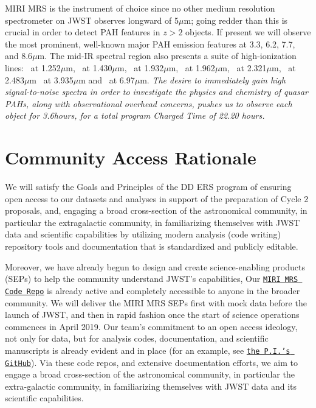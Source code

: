 \smallskip \smallskip
\noindent
MIRI MRS is the instrument of choice since no other medium resolution
spectrometer on JWST observes longward of 5$\mu$m; going redder than
this is crucial in order to detect PAH features in $z>2$ objects.  
If present we will observe the most prominent, well-known major PAH emission 
features at 3.3, 6.2, 7.7, and 8.6$\mu$m. The mid-IR spectral region also 
presents a suite of high-ionization lines: 
\snine\ at 1.252$\mu$m, \six\ at 1.430$\mu$m, \sixi\ at 1.932$\mu$m,  
\sivi\ at 1.962$\mu$m, \caviii\ at 2.321$\mu$m, \sivi\ at 2.483$\mu$m 
\siix\ at 3.935$\mu$m and \arii\ at 6.97$\mu$m. 
{\it The 
desire to immediately gain high signal-to-noise spectra in order to
investigate the physics and chemistry of quasar PAHs, along with
observational overhead concerns, pushes us to observe each object for
3.6hours, for a total program Charged Time of 22.20 hours.}



\section*{Community Access Rationale}
\vspace{-6pt}
\noindent
We will satisfy the Goals and Principles of the DD ERS program of
ensuring open access to our datasets and analyses in support of the
preparation of Cycle 2 proposals, and, engaging a broad cross-section
of the astronomical community, in particular the extragalactic
community, in familiarizing themselves with JWST data and scientific
capabilities by utilizing modern analysis (code writing) repository
tools and documentation that is standardized and publicly editable.

\smallskip \smallskip
\noindent
Moreover, we have already begun to design and create science-enabling
products (SEPs) to help the community understand JWST's capabilities,
Our \href{https://github.com/miri-mrs}{{\tt MIRI MRS Code Repo}} is
already active and completely accessible to anyone in the broader
community.  We will deliver the MIRI MRS SEPs first with mock data
before the launch of JWST, and then in rapid fashion once the start of
science operations commences in April 2019.
Our team's commitment to an open access ideology, not only for data,
but for analysis codes, documentation, and scientific manuscripts is
already evident and in place (for an example, see
\href{https://github.com/d80b2t}{{\tt the P.I.'s GitHub}}).  Via these
code repos, and extensive documentation efforts, we aim to engage a
broad cross-section of the astronomical community, in particular the
extra-galactic community, in familiarizing themselves with JWST data
and its scientific capabilities.

